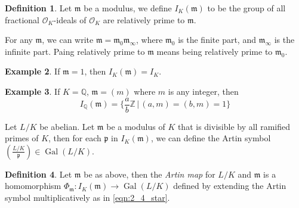 \documentclass[11pt]{article}
\theoremstyle{definition}
\newtheorem{definition}{Definition}[section]
\newtheorem{example}[definition]{Example}
\theoremstyle{plain}
\theoremstyle{remark}
\DeclareMathOperator{\Gal}{Gal}
\newcommand{\ZZ}{\mathbb{Z}}
\newcommand{\QQ}{\mathbb{Q}}
\newcommand{\cO}{\mathcal{O}}
\newcommand{\fp}{\mathfrak{p}}
\newcommand{\fm}{\mathfrak{m}}
\newcommand{\leg}[2]{\left(\frac{#1}{#2}\right)}
\begin{document}
\begin{definition}\label{def:2_7}
    Let $\fm$ be a modulus, we define $I_K(\fm)$ to be the group of all fractional $\cO_K$-ideals of $\cO_K$ are relatively prime to $\fm$.
\end{definition}

For any $\fm$, we can write $\fm = \fm_0 \fm_\infty$, where $\fm_0$ is the finite part, and $\fm_\infty$ is the infinite part. Paing relatively prime to $\fm$ means being relatively prime to $\fm_0$.

\begin{example}\label{eg:2_8}
    If $\fm = 1$, then $I_K(\fm) = I_K$.
\end{example}

\begin{example}\label{eg:2_9}
    If $K = \QQ$, $\fm = (m)$ where $m$ is any integer, then
    \begin{equation*}
        I_\QQ(\fm) = \bigg\{ \frac{a}{b}\ZZ \,\bigg\vert\, (a, m) = (b, m) = 1 \bigg\}
    \end{equation*}
\end{example}

Let $L/K$ be abelian. Let $\fm$ be a modulus of $K$ that is divisible by all ramified primes of $K$, then for each $\fp$ in $I_K(\fm)$, we can define the Artin symbol $\leg{L/K}{\fp} \in \Gal(L/K)$.

\begin{definition}\label{def:2_10}
    Let $\fm$ be as above, then the \emph{Artin map} for $L/K$ and $\fm$ is a homomorphism $\Phi_{\fm} : I_K(\fm) \to \Gal(L/K)$ defined by extending the Artin symbol multiplicatively as in \eqref{eqn:2_4_star}.
\end{definition}
\end{document}
